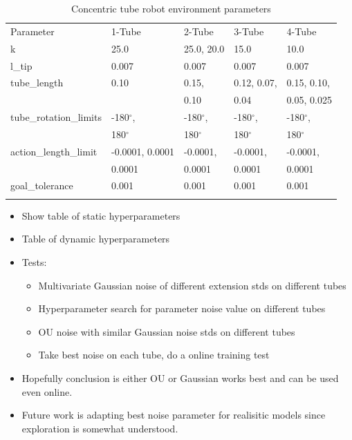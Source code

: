\begin{table}
\caption{Concentric tube robot environment parameters}
\label{tab:4}       %
\begin{tabular}{lllll}
\hline\noalign{\smallskip}
Parameter & 1-Tube & 2-Tube & 3-Tube & 4-Tube\\
\noalign{\smallskip}\hline\noalign{\smallskip}
k & 25.0 & 25.0, 20.0 & 15.0 & 10.0\\
l\_tip  & 0.007 & 0.007 & 0.007 & 0.007\\
tube\_length & 0.10 & 0.15, & 0.12, 0.07, & 0.15, 0.10, \\
& & 0.10 & 0.04 & 0.05, 0.025 \\
tube\_rotation\_limits  & -180$^\circ$,  & -180$^\circ$, & -180$^\circ$, & -180$^\circ$,\\
& 180$^\circ$ & 180$^\circ$ & 180$^\circ$ & 180$^\circ$\\
action\_length\_limit & -0.0001, 0.0001 & -0.0001, & -0.0001, & -0.0001, \\
& 0.0001 & 0.0001 & 0.0001 & 0.0001 \\
goal\_tolerance & 0.001 & 0.001 & 0.001 & 0.001\\

\noalign{\smallskip}\hline
\end{tabular}
\end{table}

\begin{itemize}
    \item Show table of static hyperparameters
    \item Table of dynamic hyperparameters
    \item Tests:
    \begin{itemize}
        \item Multivariate Gaussian noise of different extension stds on different tubes
        \item Hyperparameter search for parameter noise value on different tubes
        \item OU noise with similar Gaussian noise stds on different tubes
        \item Take best noise on each tube, do a online training test
    \end{itemize}
    \item Hopefully conclusion is either OU or Gaussian works best and can be used even online.
    \item Future work is adapting best noise parameter for realisitic models since exploration is somewhat understood.

\end{itemize}

